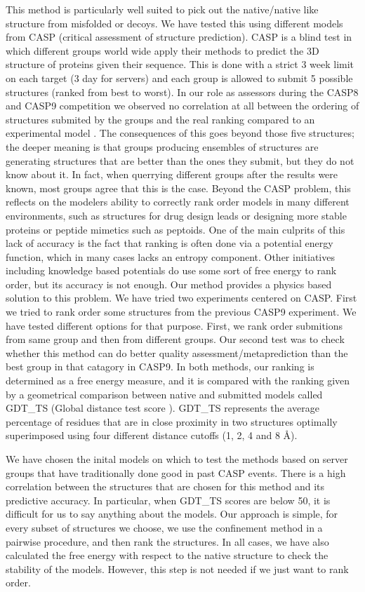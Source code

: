 \documentclass[12pt]{article}
\begin{document}
This method is particularly well suited to pick out the native/native like structure from misfolded or decoys. We have
tested this using different models from CASP (critical assessment of structure
prediction). CASP is a blind test in which different groups world wide apply their
methods to predict the 3D structure of proteins given their sequence. This is done with a strict 3
week limit on each target (3 day for servers) and each group is allowed to submit 5 possible
structures (ranked from best to worst). In our role as assessors during the CASP8 and CASP9 \cite{MacCallum2011}
competition we observed no correlation at all between the ordering of structures submited by the
groups and the real ranking compared to an experimental model \cite{Kryshtafovych2011}. The
consequences of this goes beyond
those five structures; the deeper meaning is that groups producing ensembles of structures are
generating structures that are better than the ones they submit, but they do not know about it. In
fact, when querrying different groups after the results were known, most groups agree that this is
the case. Beyond the CASP problem, this reflects on the modelers ability to correctly rank order
models in many different environments, such as structures for drug design leads or designing more
stable proteins or peptide mimetics such as peptoids. One of the main culprits of this lack of
accuracy is the fact that ranking is often done via a potential energy function, which in many cases
lacks an entropy component. Other initiatives including knowledge based potentials do use some sort
of free energy to rank order, but its accuracy is not enough. Our method provides a physics based
solution to this problem. We have tried two experiments centered on CASP. First we tried to rank
order some structures from the previous CASP9 experiment. We have tested different options for that purpose.
First, we rank order submitions from same group and then from different groups. Our second test was 
to check whether this method can do better quality assessment/metaprediction than the best group in that catagory in CASP9. 
In both methods, our ranking is determined as a free energy measure,
and it is compared with the ranking given by a geometrical comparison between native and submitted
models called GDT\_TS (Global distance test score \cite{Zemla2003}). 
GDT\_TS represents the average percentage of residues that are in close proximity in two
structures optimally superimposed using four different distance cutoffs (1, 2, 4 and 8 Å).

We have chosen the inital models on which to test the methods based on server groups that have
traditionally done good in past CASP events. There is a high correlation between the structures that
are chosen for this method and its predictive accuracy. In particular, when GDT\_TS scores are below
50, it is difficult for us to say anything about the models. Our approach is simple, for every
subset of structures we choose, we use the confinement method in a pairwise procedure, and then rank
the structures. In all cases, we have also calculated the free energy with respect to the native
structure to check the stability of the models.
However, this step is not needed if we just want to rank order.
\end{document}
